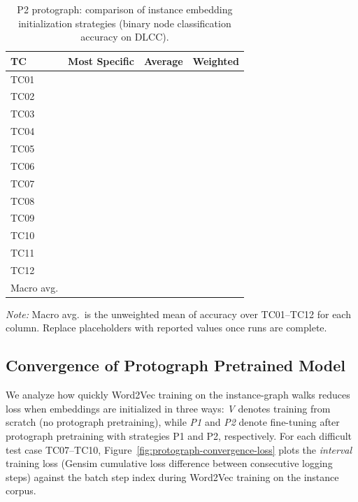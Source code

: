 \documentclass[a4paper,oneside,bibliography=totoc]{scrartcl}
\begin{document}
\begingroup
\newcommand{\D}{\textemdash{}}
\begin{table}[t]
  \centering
  \caption{P2 protograph: comparison of instance embedding initialization strategies (binary node classification accuracy on DLCC).}
  \label{tab:p2-init-strategies}
  \footnotesize
  \setlength{\tabcolsep}{4pt}
  \begin{tabular}{@{}lccc@{}}
    \toprule
    TC
      & Most Specific
      & Average
      & Weighted \\
    \midrule
    TC01 & \D & \D & \D \\
    TC02 & \D & \D & \D \\
    TC03 & \D & \D & \D \\
    TC04 & \D & \D & \D \\
    TC05 & \D & \D & \D \\
    TC06 & \D & \D & \D \\
    TC07 & \D & \D & \D \\
    TC08 & \D & \D & \D \\
    TC09 & \D & \D & \D \\
    TC10 & \D & \D & \D \\
    TC11 & \D & \D & \D \\
    TC12 & \D & \D & \D \\
    \midrule
    Macro avg.
      & \D & \D & \D \\
    \bottomrule
  \end{tabular}
  \vspace{0.4em}
  \par\noindent\small\textit{Note:} Macro avg.\ is the unweighted mean of accuracy over TC01--TC12 for each column. Replace placeholders with reported values once runs are complete.
\end{table}
\endgroup

\subsection{Convergence of Protograph Pretrained Model}
We analyze how quickly Word2Vec training on the instance-graph walks reduces loss when embeddings are initialized in three ways:
\textit{V} denotes training from scratch (no protograph pretraining), while \textit{P1} and \textit{P2} denote fine-tuning after protograph pretraining with strategies P1 and P2, respectively.
For each difficult test case TC07--TC10, Figure~\ref{fig:protograph-convergence-loss} plots the \emph{interval} training loss (Gensim cumulative loss difference between consecutive logging steps) against the batch step index during Word2Vec training on the instance corpus.
\end{document}
